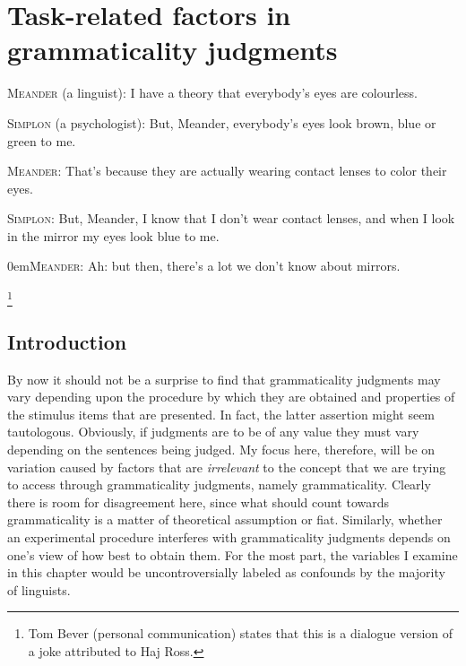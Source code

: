 \chapter{Task-related factors in grammaticality judgments}\label{sec:5}

\textsc{Meander} (a linguist): I have a theory that everybody's eyes are colourless.

{\leftskip=10pt\parindent -10pt
\textsc{Simplon} (a psychologist):  But, Meander, everybody's eyes look brown, blue or green to me.

\textsc{Meander}: That's because they are actually wearing contact lenses to color
their eyes.

\textsc{Simplon}: But, Meander, I know that I don't wear contact lenses, and when I look in the mirror my eyes look blue to me.

\parindent 0em\textsc{Meander}: Ah: but then, there's a lot we don't know about mirrors.
}\begin{flushright}\citep{Bever1974}\footnote{Tom Bever (personal communication) states that this is a dialogue version of a joke attributed to Haj Ross.}\end{flushright}


\section{Introduction}\label{sec:5.1}

By now it should not be a surprise to find that grammaticality judgments may vary depending upon the procedure by which they are obtained and properties of the stimulus items that are presented. In fact, the latter assertion might seem tautologous. Obviously, if judgments are to be of any value they must vary depending on the sentences being judged. My focus here, therefore, will be on variation caused by factors that are \textit{irrelevant} to the concept that we are trying to access through grammaticality judgments, namely grammaticality. Clearly there is room for disagreement here, since what should count towards grammaticality is a matter of theoretical assumption or fiat. Similarly, whether an experimental procedure interferes with grammaticality judgments depends on one's view of how best to obtain them. For the most part, the variables I examine in this chapter would be uncontroversially labeled as confounds by the majority of linguists.




